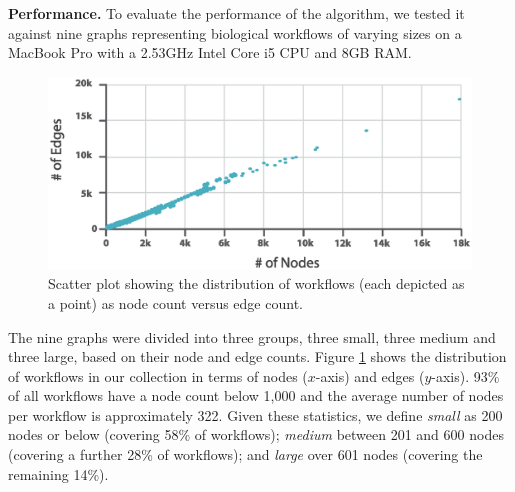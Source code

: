 
\noindent \textbf{Performance.} To evaluate the performance of the algorithm, we tested it against nine graphs representing biological workflows of varying sizes on a MacBook Pro with a 2.53GHz Intel Core i5 CPU and 8GB RAM.

\begin{figure}[t!]
\centering
\includegraphics[width=.75\textwidth]{images/automacron/workflow-size.eps}
\caption{Scatter plot showing the distribution of workflows (each depicted as a point) as node count versus edge count.}
\vspace{-4mm}
\label{fig:workflow-size}
\end{figure}


The nine graphs were divided into three groups, three small, three medium and three large, based on their node and edge counts.
Figure \ref{fig:workflow-size} shows the distribution of workflows in our collection in terms of nodes ($x$-axis) and edges ($y$-axis).
93\% of all workflows have a node count below 1,000 and the average number of nodes per workflow is approximately 322.
Given these statistics, we define \emph{small} as 200 nodes or below (covering 58\% of workflows); \emph{medium} between 201 and 600 nodes (covering a further 28\% of workflows); and \emph{large} over 601 nodes (covering the remaining 14\%). 


